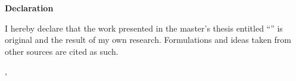 
\null
\vfill
{\noindent\bf Declaration}

\begin{singlepar}
    I hereby declare that the work presented in the master's thesis entitled \enquote{\thesisTitle} is original
    and the result of my own research. Formulations and ideas taken from other sources are cited as such.


\end{singlepar}

\vspace{3em}

\noindent\thesisPlace, \thesisYear \hfill \makebox[15em]{\hrulefill}
\par\noindent\hfill\makebox[15em][c]{\thesisAuthor}
